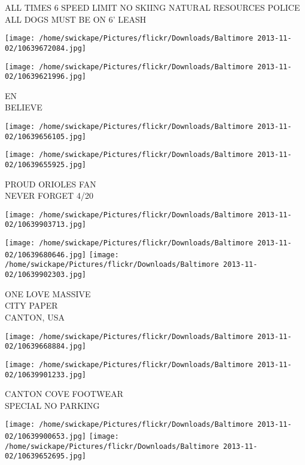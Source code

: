 \documentclass[10pt,letterpaper]{article}
\begin{document}
ALL TIMES 6 SPEED LIMIT NO SKIING NATURAL RESOURCES POLICE\\
ALL DOGS MUST BE ON 6' LEASH\\
\pagebreak

\texttt{[image: /home/swickape/Pictures/flickr/Downloads/Baltimore 2013-11-02/10639672084.jpg]}

\vspace{0.25in}
\texttt{[image: /home/swickape/Pictures/flickr/Downloads/Baltimore 2013-11-02/10639621996.jpg]}

EN\\
BELIEVE\\
\pagebreak

\texttt{[image: /home/swickape/Pictures/flickr/Downloads/Baltimore 2013-11-02/10639656105.jpg]}

\vspace{0.25in}
\texttt{[image: /home/swickape/Pictures/flickr/Downloads/Baltimore 2013-11-02/10639655925.jpg]}

PROUD ORIOLES FAN\\
NEVER FORGET 4/20\\
\pagebreak

\texttt{[image: /home/swickape/Pictures/flickr/Downloads/Baltimore 2013-11-02/10639903713.jpg]}

\vspace{0.25in}
\texttt{[image: /home/swickape/Pictures/flickr/Downloads/Baltimore 2013-11-02/10639680646.jpg]}
\texttt{[image: /home/swickape/Pictures/flickr/Downloads/Baltimore 2013-11-02/10639902303.jpg]}

ONE LOVE MASSIVE\\
CITY PAPER\\
CANTON, USA\\
\pagebreak

\texttt{[image: /home/swickape/Pictures/flickr/Downloads/Baltimore 2013-11-02/10639668884.jpg]}

\vspace{0.25in}
\texttt{[image: /home/swickape/Pictures/flickr/Downloads/Baltimore 2013-11-02/10639901233.jpg]}

CANTON COVE FOOTWEAR\\
SPECIAL NO PARKING\\
\pagebreak

\texttt{[image: /home/swickape/Pictures/flickr/Downloads/Baltimore 2013-11-02/10639900653.jpg]}
\texttt{[image: /home/swickape/Pictures/flickr/Downloads/Baltimore 2013-11-02/10639652695.jpg]}
\end{document}
